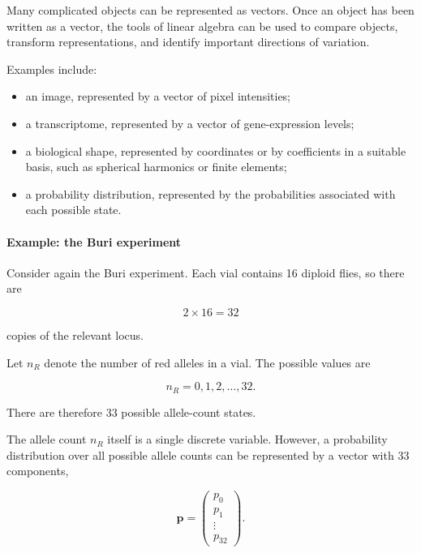 Many complicated objects can be represented as vectors.
Once an object has been written as a vector, the tools of linear algebra can be used to compare objects, transform representations, and identify important directions of variation.

Examples include:

\begin{itemize}
    \item an image, represented by a vector of pixel intensities;
    \item a transcriptome, represented by a vector of gene-expression levels;
    \item a biological shape, represented by coordinates or by coefficients in a suitable basis, such as spherical harmonics or finite elements;
    \item a probability distribution, represented by the probabilities associated with each possible state.
\end{itemize}


\paragraph{Example: the Buri experiment}

Consider again the Buri experiment.
Each vial contains 16 diploid flies, so there are

\begin{equation}
    2\times16=32
\end{equation}

copies of the relevant locus.

Let $n_R$ denote the number of red alleles in a vial.
The possible values are

\begin{equation}
    n_R=0,1,2,\ldots,32.
\end{equation}

There are therefore 33 possible allele-count states.

The allele count $n_R$ itself is a single discrete variable.
However, a probability distribution over all possible allele counts can be represented by a vector with 33 components,

\begin{equation}
    \mathbf{p} =
    \begin{pmatrix}
        p_0 \\
        p_1 \\
        \vdots \\
        p_{32}
    \end{pmatrix}.
\end{equation}

